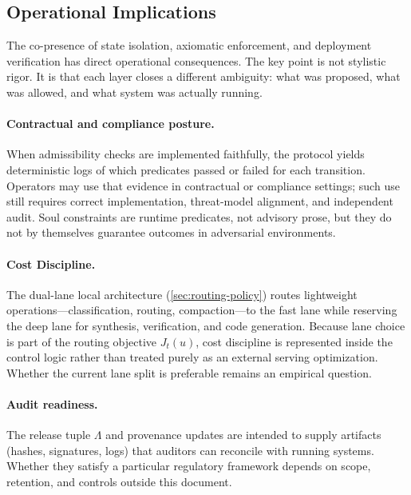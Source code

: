 \documentclass[11pt]{article}
\theoremstyle{remark}
\begin{document}
\subsection{Operational Implications}

The co-presence of state isolation, axiomatic enforcement, and deployment verification has direct operational consequences. The key point is not stylistic rigor. It is that each layer closes a different ambiguity: what was proposed, what was allowed, and what system was actually running.

\paragraph{Contractual and compliance posture.}
When admissibility checks are implemented faithfully, the protocol yields deterministic logs of which predicates passed or failed for each transition. Operators may use that evidence in contractual or compliance settings; such use still requires correct implementation, threat-model alignment, and independent audit. Soul constraints are runtime predicates, not advisory prose, but they do not by themselves guarantee outcomes in adversarial environments.

\paragraph{Cost Discipline.}
The dual-lane local architecture (\cref{sec:routing-policy}) routes lightweight operations---classification, routing, compaction---to the fast lane while reserving the deep lane for synthesis, verification, and code generation. Because lane choice is part of the routing objective \(J_t(u)\), cost discipline is represented inside the control logic rather than treated purely as an external serving optimization. Whether the current lane split is preferable remains an empirical question.

\paragraph{Audit readiness.}
The release tuple $\Lambda$ and provenance updates are intended to supply artifacts (hashes, signatures, logs) that auditors can reconcile with running systems. Whether they satisfy a particular regulatory framework depends on scope, retention, and controls outside this document.
\end{document}
